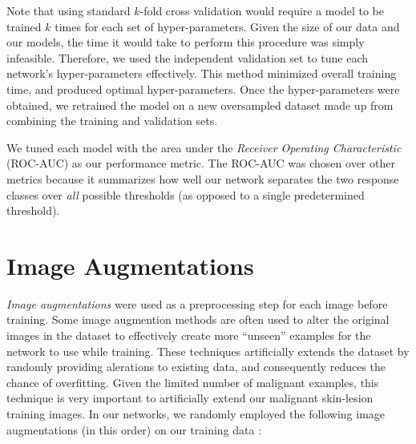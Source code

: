 \documentclass [MAS] {uclathes}
\begin{document}
Note that using standard $k$-fold cross validation would require a model to be trained $k$ times for each set of hyper-parameters. Given the size of our data and our models, the time it would take to perform this procedure was simply infeasible. Therefore, we used the independent validation set to tune each network's hyper-parameters effectively. This method minimized overall training time, and produced optimal hyper-parameters. Once the hyper-parameters were obtained, we retrained the model on a new oversampled dataset made up from combining the training and validation sets.

We tuned each model with the area under the \textit{Receiver Operating Characteristic} (ROC-AUC) as our performance
metric. The ROC-AUC was chosen over other metrics because it summarizes how well our network separates the two response
classes over \textit{all} possible thresholds (as opposed to a single predetermined threshold). 

\section{Image Augmentations}

\textit{Image augmentations} were used as a preprocessing step for each image before training. Some image augmention methods are often used to alter the original images in the dataset to effectively create more ``unseen'' examples for the network to use while training. These techniques artificially extends the dataset by randomly providing alerations to existing data, and consequently reduces the chance of overfitting. Given the limited number of malignant examples, this technique is very important to artificially extend our malignant skin-lesion training images. In our networks, we randomly employed the following image augmentations (in this order) on our training data \cite{AUG}:
\end{document}
